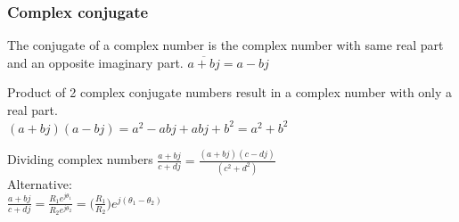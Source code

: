 \begin{frame}
	\frametitle{Complex conjugate}
	\begin{definition}
		The conjugate of a complex number is the complex number with same real part and an opposite imaginary part.
		$\overline{a+bj} = a-bj$
	\end{definition}
	Product of 2 complex conjugate numbers result in a complex number with only a real part.\\
	$(a + bj)(a-bj) = a^2 - abj + abj + b^2= a^2 +b^2$\\
	\begin{block}{Dividing complex numbers}
			$\frac{a+bj}{c+dj} = \frac{(a+bj)(c-dj)}{(c^2+d^2)}$\\
			Alternative:\\
			$\frac{a+bj}{c+dj} = \frac{R_1 e^{j\theta_1}}{R_2 e^{j \theta_2}} = \big(\frac{R_1}{R_2}\big) e^{j(\theta_1-\theta_2)}$
	\end{block}

\end{frame}